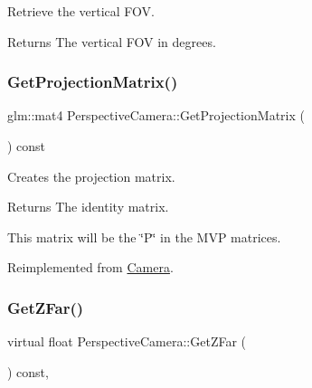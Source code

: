 Retrieve the vertical F\+OV. 

\begin{DoxyReturn}{Returns}
The vertical F\+OV in degrees. 
\end{DoxyReturn}
\hypertarget{class_perspective_camera_ab467388c7d3e4c2ef9b498c16f291545}{}\label{class_perspective_camera_ab467388c7d3e4c2ef9b498c16f291545} 
\subsubsection{\texorpdfstring{Get\+Projection\+Matrix()}{GetProjectionMatrix()}}
{\footnotesize\ttfamily glm\+::mat4 Perspective\+Camera\+::\+Get\+Projection\+Matrix (\begin{DoxyParamCaption}{ }\end{DoxyParamCaption}) const\hspace{0.3cm}{\ttfamily [virtual]}}



Creates the projection matrix. 

\begin{DoxyReturn}{Returns}
The identity matrix.
\end{DoxyReturn}
This matrix will be the \char`\"{}\+P\char`\"{} in the M\+VP matrices. 

Reimplemented from \hyperlink{class_camera_af6f4415189deaff158ba86f0b3527a30}{Camera}.

\hypertarget{class_perspective_camera_ae2e2bbd9e4bb5126c6f1de1606cd9c3e}{}\label{class_perspective_camera_ae2e2bbd9e4bb5126c6f1de1606cd9c3e} 
\subsubsection{\texorpdfstring{Get\+Z\+Far()}{GetZFar()}}
{\footnotesize\ttfamily virtual float Perspective\+Camera\+::\+Get\+Z\+Far (\begin{DoxyParamCaption}{ }\end{DoxyParamCaption}) const\hspace{0.3cm}{\ttfamily [inline]}, {\ttfamily [virtual]}}

\hypertarget{class_perspective_camera_ad9bd7e6bccb38c178dbd90d8d0a5778b}{}\label{class_perspective_camera_ad9bd7e6bccb38c178dbd90d8d0a5778b} 
